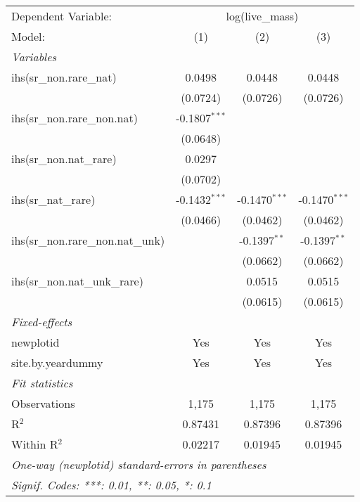 \begin{tabular}{lccc}
\tabularnewline\midrule\midrule
Dependent Variable:&\multicolumn{3}{c}{log(live\_mass)}\\
Model:&(1) & (2) & (3)\\
\midrule \emph{Variables}&   &   &  \\
ihs(sr\_non.rare\_nat)&0.0498 & 0.0448 & 0.0448\\
  &(0.0724) & (0.0726) & (0.0726)\\
ihs(sr\_non.rare\_non.nat)&-0.1807$^{***}$ &    &   \\
  &(0.0648) &    &   \\
ihs(sr\_non.nat\_rare)&0.0297 &    &   \\
  &(0.0702) &    &   \\
ihs(sr\_nat\_rare)&-0.1432$^{***}$ & -0.1470$^{***}$ & -0.1470$^{***}$\\
  &(0.0466) & (0.0462) & (0.0462)\\
ihs(sr\_non.rare\_non.nat\_unk)&   & -0.1397$^{**}$ & -0.1397$^{**}$\\
  &   & (0.0662) & (0.0662)\\
ihs(sr\_non.nat\_unk\_rare)&   & 0.0515 & 0.0515\\
  &   & (0.0615) & (0.0615)\\
\midrule \emph{Fixed-effects}&   &   &  \\
newplotid & Yes & Yes & Yes\\
site.by.yeardummy & Yes & Yes & Yes\\
\midrule \emph{Fit statistics}&  & & \\
Observations & 1,175&1,175&1,175\\
R$^2$ & 0.87431&0.87396&0.87396\\
Within R$^2$ & 0.02217&0.01945&0.01945\\
\midrule\midrule\multicolumn{4}{l}{\emph{One-way (newplotid) standard-errors in parentheses}}\\
\multicolumn{4}{l}{\emph{Signif. Codes: ***: 0.01, **: 0.05, *: 0.1}}\\
\end{tabular}



